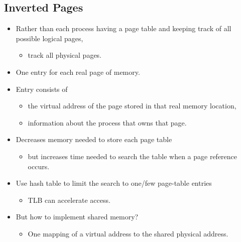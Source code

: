 \documentclass[11pt,a4paper]{article}
\begin{document}
\subsection{Inverted Pages}
\begin{itemize}
    \item Rather than each process having a page table and keeping track of all possible
        logical pages,
        \begin{itemize}
            \item track all physical pages.
        \end{itemize}
    \item One entry for each real page of memory.
    \item Entry consists of
        \begin{itemize}
            \item the virtual address of the page stored in that real memory location,
            \item information about the process that owns that page.
        \end{itemize}
    \item Decreases memory needed to store each page table
        \begin{itemize}
            \item but increases time needed to search the table when a page reference occurs.
        \end{itemize}
    \item Use hash table to limit the search to one/few page-table entries
        \begin{itemize}
            \item TLB can accelerate access.
        \end{itemize}
    \item But how to implement shared memory?
        \begin{itemize}
            \item One mapping of a virtual address to the shared physical address.
        \end{itemize}
\end{itemize}
\end{document}
